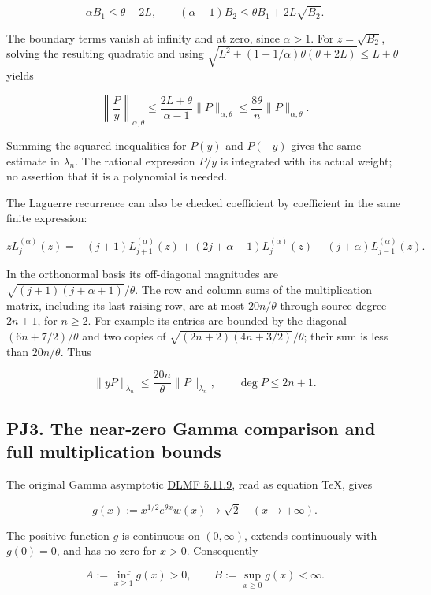 \documentclass[10pt]{article}
\begin{document}
\[
\alpha B_1\le\theta+2L,
\qquad
(\alpha-1)B_2\le\theta B_1+2L\sqrt{B_2}.
\tag{PJ10}
\]

The boundary terms vanish at infinity and at zero, since \(\alpha>1\). For \(z=\sqrt{B_2}\), solving the resulting quadratic and using \(\sqrt{L^2+(1-1/\alpha)\theta(\theta+2L)}\le L+\theta\) yields

\[
\left\|\frac P y\right\|_{\alpha,\theta}
\le\frac{2L+\theta}{\alpha-1}\|P\|_{\alpha,\theta}
\le\frac{8\theta}{n}\|P\|_{\alpha,\theta}.
\tag{PJ11}
\]

Summing the squared inequalities for \(P(y)\) and \(P(-y)\) gives the same estimate in \(\lambda_n\). The rational expression \(P/y\) is integrated with its actual weight; no assertion that it is a polynomial is needed.

The Laguerre recurrence can also be checked coefficient by coefficient in the same finite expression:

\[
zL_j^{(\alpha)}(z)=-(j+1)L_{j+1}^{(\alpha)}(z)
+(2j+\alpha+1)L_j^{(\alpha)}(z)-(j+\alpha)L_{j-1}^{(\alpha)}(z).
\]

In the orthonormal basis its off-diagonal magnitudes are \(\sqrt{(j+1)(j+\alpha+1)}/\theta\). The row and column sums of the multiplication matrix, including its last raising row, are at most \(20n/\theta\) through source degree \(2n+1\), for \(n\ge2\). For example its entries are bounded by the diagonal \((6n+7/2)/\theta\) and two copies of \(\sqrt{(2n+2)(4n+3/2)}/\theta\); their sum is less than \(20n/\theta\). Thus

\[
\|yP\|_{\lambda_n}\le\frac{20n}{\theta}\|P\|_{\lambda_n},
\qquad\deg P\le2n+1.
\tag{PJ12}
\]

\subsection{PJ3. The near-zero Gamma comparison and full multiplication bounds}\label{pj3.-the-near-zero-gamma-comparison-and-full-multiplication-bounds}

The original Gamma asymptotic \href{https://dlmf.nist.gov/5.11.E9}{DLMF 5.11.9}, read as equation TeX, gives

\[
g(x):=x^{1/2}e^{\theta x}w(x)\longrightarrow\sqrt2
\quad(x\to+\infty).
\]

The positive function \(g\) is continuous on \((0,\infty)\), extends continuously with \(g(0)=0\), and has no zero for \(x>0\). Consequently

\[
A:=\inf_{x\ge1}g(x)>0,\qquad
B:=\sup_{x\ge0}g(x)<\infty.
\tag{PJ13}
\]
\end{document}
